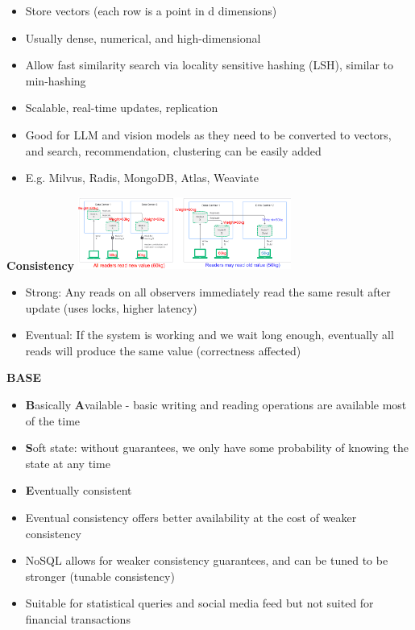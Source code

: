 \documentclass[10pt, landscape]{article}
\begin{document}
\begin{multicols}{4}
\begin{itemize}
  \begin{itemize}
    \item Store vectors (each row is a point in d dimensions)
    \item Usually dense, numerical, and high-dimensional 
    \item Allow fast similarity search via locality sensitive hashing (LSH), similar to min-hashing
    \item Scalable, real-time updates, replication
    \item Good for LLM and vision models as they need to be converted to vectors, and search, recommendation, clustering can be easily added 
    \item E.g. Milvus, Radis, MongoDB, Atlas, Weaviate
  \end{itemize}
\end{itemize}

\textbf{Consistency}
\includegraphics*[width=7cm]{consistency}
\begin{itemize}
  \item Strong: Any reads on all observers immediately read the same result after update (uses locks, higher latency)
  \item Eventual: If the system is working and we wait long enough, eventually all reads will produce the same value (correctness affected)
\end{itemize}

\textbf{BASE}
\begin{itemize}
  \item \textbf{B}asically \textbf{A}vailable - basic writing and reading operations are available most of the time 
  \item \textbf{S}oft state: without guarantees, we only have some probability of knowing the state at any time 
  \item \textbf{E}ventually consistent
  \item Eventual consistency offers better availability at the cost of weaker consistency 
  \item NoSQL allows for weaker consistency guarantees, and can be tuned to be stronger (tunable consistency)
  \item Suitable for statistical queries and social media feed but not suited for financial transactions 
\end{itemize}


\end{multicols}
\end{document}
